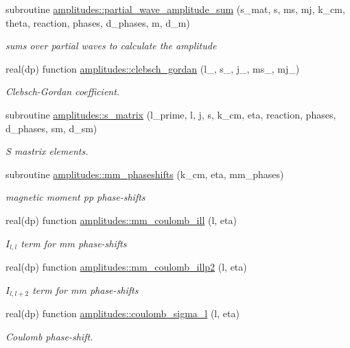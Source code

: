 \begin{DoxyCompactItemize}
\item 
subroutine \hyperlink{namespaceamplitudes_ac9837614da738e17c9e58c87af369eef}{amplitudes\+::partial\+\_\+wave\+\_\+amplitude\+\_\+sum} (s\+\_\+mat, s, ms, mj, k\+\_\+cm, theta, reaction, phases, d\+\_\+phases, m, d\+\_\+m)
\begin{DoxyCompactList}\small\item\em sums over partial waves to calculate the amplitude \end{DoxyCompactList}\item 
real(dp) function \hyperlink{namespaceamplitudes_a6951abfeedd0051bf2e6de17ecc63192}{amplitudes\+::clebsch\+\_\+gordan} (l\+\_\+, s\+\_\+, j\+\_\+, ms\+\_\+, mj\+\_\+)
\begin{DoxyCompactList}\small\item\em Clebsch-\/\+Gordan coefficient. \end{DoxyCompactList}\item 
subroutine \hyperlink{namespaceamplitudes_aa0bb740284302f942c6c9a699e5ca02e}{amplitudes\+::s\+\_\+matrix} (l\+\_\+prime, l, j, s, k\+\_\+cm, eta, reaction, phases, d\+\_\+phases, sm, d\+\_\+sm)
\begin{DoxyCompactList}\small\item\em S mastrix elements. \end{DoxyCompactList}\item 
subroutine \hyperlink{namespaceamplitudes_a35c5cf6a646b74a95d965607bb5e9de1}{amplitudes\+::mm\+\_\+phaseshifts} (k\+\_\+cm, eta, mm\+\_\+phases)
\begin{DoxyCompactList}\small\item\em magnetic moment pp phase-\/shifts \end{DoxyCompactList}\item 
real(dp) function \hyperlink{namespaceamplitudes_abb9203b80454e518fb0b7083145bfcd8}{amplitudes\+::mm\+\_\+coulomb\+\_\+ill} (l, eta)
\begin{DoxyCompactList}\small\item\em $I_{l,l}$ term for mm phase-\/shifts \end{DoxyCompactList}\item 
real(dp) function \hyperlink{namespaceamplitudes_a36e09d619793ad91a1a65660cbf4ad7f}{amplitudes\+::mm\+\_\+coulomb\+\_\+illp2} (l, eta)
\begin{DoxyCompactList}\small\item\em $I_{l,l+2}$ term for mm phase-\/shifts \end{DoxyCompactList}\item 
real(dp) function \hyperlink{namespaceamplitudes_a6d36494ebd9aa3af10c1f7c40c80e876}{amplitudes\+::coulomb\+\_\+sigma\+\_\+l} (l, eta)
\begin{DoxyCompactList}\small\item\em Coulomb phase-\/shift. \end{DoxyCompactList}\end{DoxyCompactItemize}
